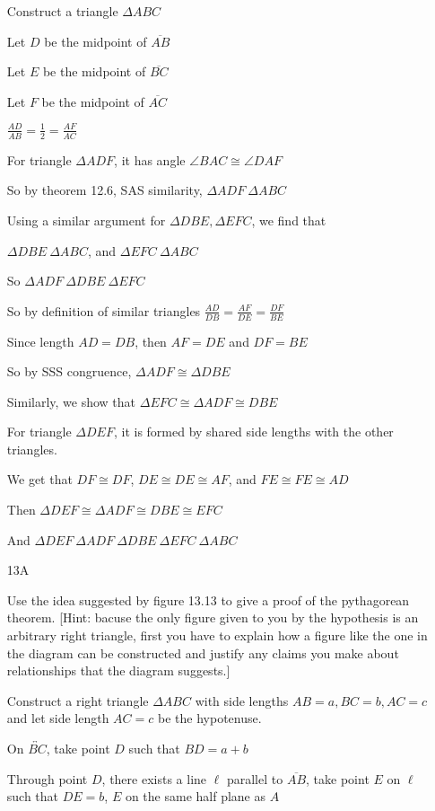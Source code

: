\documentclass[11pt]{article}
\newcommand{\lines}[1]{\overleftrightarrow{#1}}
\newcommand{\segment}[1]{\overline{#1}}
\begin{document}
\begin{itemize}
		Construct a triangle $\Delta ABC$

		Let $D$ be the midpoint of $\segment{AB}$

		Let $E$ be the midpoint of $\segment{BC}$

		Let $F$ be the midpoint of $\segment{AC}$

		$\frac{AD}{AB} = \frac{1}{2} = \frac{AF}{AC}$

		For triangle $\Delta ADF$, it has angle $\angle BAC \cong \angle DAF$

		So by theorem 12.6, SAS similarity, $\Delta ADF ~ \Delta ABC$

		Using a similar argument for $\Delta DBE, \Delta EFC$, we find that

		$\Delta DBE ~ \Delta ABC$, and $\Delta EFC ~ \Delta ABC$

		So $\Delta ADF ~ \Delta DBE ~ \Delta EFC$

		So by definition of similar triangles $\frac{AD}{DB} = \frac{AF}{DE} = \frac{DF}{BE}$

		Since length $AD = DB$, then $AF = DE$ and $DF = BE$

		So by SSS congruence, $\Delta ADF \cong \Delta DBE$

		Similarly, we show that $\Delta EFC \cong \Delta ADF \cong DBE$

		For triangle $\Delta DEF$, it is formed by shared side lengths with the other triangles.

		We get that $DF \cong DF$, $DE \cong DE \cong AF$, and $FE \cong FE \cong AD$

		Then $\Delta DEF \cong \Delta ADF \cong DBE \cong EFC$

		And $\Delta DEF ~ \Delta ADF ~ \Delta DBE ~ \Delta EFC ~ \Delta ABC$

	\item[13A]

		Use the idea suggested by figure 13.13 to give a proof of the pythagorean theorem. [Hint: bacuse the only figure given to you by the hypothesis is an arbitrary right triangle, first you have to explain how a figure like the one in the diagram can be constructed and justify any claims you make about relationships that the diagram suggests.] 

		Construct a right triangle $\Delta ABC$ with side lengths $AB = a, BC = b, AC = c$ and let side length $AC = c$ be the hypotenuse.

		On $\lines{BC}$, take point $D$ such that $BD = a + b$

		Through point $D$, there exists a line $\ell$ parallel to $\segment{AB}$, take point $E$ on $\ell$ such that $DE = b$, $E$ on the same half plane as $A$


\end{itemize}
\end{document}
